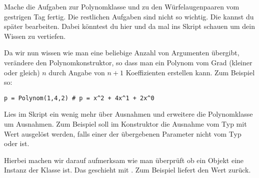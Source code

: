 \begin{aufg}
  Mache die Aufgaben zur Polynomklasse und zu den Wür\-fel\-au\-gen\-paaren vom gestrigen Tag fertig.
  Die restlichen Aufgaben sind nicht so wichtig. Die kannst du später bearbeiten.
  Dabei könntest du hier und da mal ins Skript schauen um dein Wissen zu vertiefen.
\end{aufg}

\begin{aufg}
  Da wir nun wissen wie man eine beliebige Anzahl von Argumenten übergibt, verändere den Polynomkonstruktor,
  so dass man ein Polynom vom Grad (kleiner oder gleich) $n$ durch Angabe von $n+1$ Koeffizienten erstellen kann.
  Zum Beispiel so:
  \begin{lstlisting}
p = Polynom(1,4,2) # p = x^2 + 4x^1 + 2x^0
  \end{lstlisting}
\end{aufg}

\begin{aufg}
  Lies im Skript ein wenig mehr über Ausnahmen und erweitere die Polynomklasse um Ausnahmen.
  Zum Beispiel soll im Konstruktor die Ausnahme  vom Typ  mit Wert  ausgelöst werden,
  falls einer der übergebenen Parameter nicht vom Typ  oder  ist.
  
  Hierbei machen wir darauf aufmerksam wie man überprüft ob ein Objekt  eine Instanz der Klasse  ist.
  Das geschieht mit .
  Zum Beispiel liefert  den Wert  zurück.
\end{aufg}

